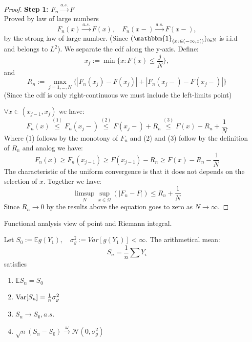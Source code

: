 \begin{proof}
\textbf{Step 1: $F_n \overset{a.s.}{\rightarrow} F$}\\
Proved by law of large numbers
\begin{equation*}
	F_n(x) \overset{a.s.}{\longrightarrow} F(x), \quad F_n(x-) \overset{a.s.}{\longrightarrow} F(x-), 
\end{equation*}
by the strong law of large number. (Since $(\mathbbm{1}_{(x_i \in (- \infty, x))})_{i \in \mathbb{N}}$ is i.i.d and belongs to $L^2$). We separate the cdf along the y-axis. Define:
\begin{equation*}
	x_j := \min \{x : F(x) \leq \frac{j}{N}\}, 
\end{equation*}
and
\begin{equation*}
	R_n := \max_{j = 1, \dots, N}\{ |F_n(x_j) - F(x_j)| + |F_n(x_j-) - F(x_j-)| \}
\end{equation*}
(Since the cdf is only right-continuous we must include the left-limits point)

$\forall x \in (x_{j - 1}, x_j)$ we have:
\begin{equation*}
	F_n(x) \overset{(1)}{\leq} F_n(x_{j}-) \overset{(2)}{\leq} F(x_j-) + R_n \overset{(3)}{\leq} F(x) + R_n + \frac{1}{N} 
\end{equation*}
Where (1) follows by the monotony of $F_n$ and (2) and (3) follow by the definition of $R_n$ and analog we have:
\begin{equation*}
	F_n(x) \geq F_n (x_{j -1}) \geq F(x_{j - 1}) - R_n \geq F(x) - R_n - \frac{1}{N}
\end{equation*}
The characteristic of the uniform convergence is that it does not depends on the selection of $x$. 
Together we have:
\begin{equation*}
	\limsup_N \sup_{x \in \Omega}(|F_n - F|) \leq R_n + \frac{1}{N}
\end{equation*}
Since $R_n \longrightarrow 0$ by the results above the equation goes to zero as $N \longrightarrow \infty$.
\end{proof}

\begin{remark}
Functional analysis view of point and Riemann integral. 	
\end{remark}


\begin{theorem}
Let $S_0 := \mathbb{E} g(Y_1), \quad \sigma_g^2:= Var[ g(Y_1) ] < \infty $. The arithmetical mean:
\begin{equation*}
	S_n = \frac{1}{n} \sum Y_i
\end{equation*}
satisfies
\begin{enumerate}
	\item $\mathbb{E} S_n = S_0$
	\item $\operatorname{Var}[S_n] = \frac{1}{n} \sigma_g^2$
	\item $S_n \longrightarrow S_0, a.s.$
	\item $\sqrt{n} (S_n - S_0) \overset{\omega}{\longrightarrow} \mathcal{N}(0, \sigma^2_g)$
\end{enumerate}
\end{theorem}

